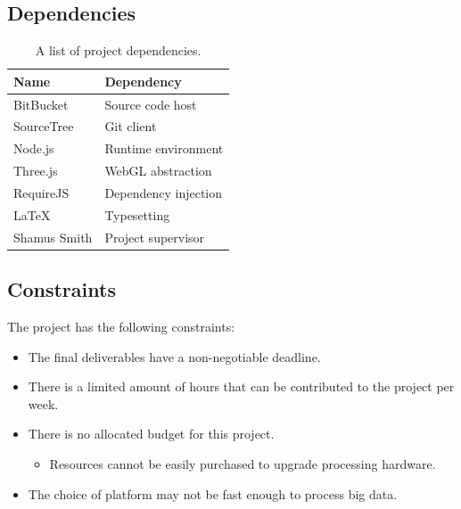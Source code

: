 \documentclass[a4paper]{article}
\begin{document}
{{{			}
		
		}
		
		\subsection{Dependencies} {
		\label{sec:dependencies}
		
			\begin{table}[H]
			\begin{tabularx}{\textwidth}{@{}XX@{}}
				\toprule
				\textbf{Name} & \textbf{Dependency} \\
				\midrule
				BitBucket & Source code host \\
				SourceTree & Git client \\
				Node.js & Runtime environment \\
				Three.js & WebGL abstraction \\
				RequireJS & Dependency injection \\
				LaTeX & Typesetting \\
				Shamus Smith & Project supervisor \\
				\bottomrule
			\end{tabularx}
			\caption{A list of project dependencies.}
			\end{table}
		
		}
		
		\subsection{Constraints} {
		\label{sec:constraints}
		
			The project has the following constraints:
			
			\begin{itemize}
				\item The final deliverables have a non-negotiable deadline.
				\item There is a limited amount of hours that can be contributed to the project per week.
				\item There is no allocated budget for this project.
				\begin{itemize}
					\item Resources cannot be easily purchased to upgrade processing hardware.
				\end{itemize}
				\item The choice of platform may not be fast enough to process big data.
			\end{itemize}
		
		}
		
}
\end{document}
